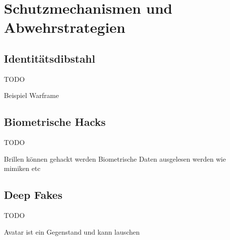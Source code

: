 \chapter{Schutzmechanismen und Abwehrstrategien}\label{ch:SchutzmechanismenundAbwehrstrategien}

\section{Identitätsdibstahl}
TODO

Beispiel Warframe

\section{Biometrische Hacks}
TODO

Brillen können gehackt werden Biometrische Daten ausgelesen werden wie mimiken etc 

\section{Deep Fakes}
TODO

Avatar ist ein Gegenstand und kann lauschen
